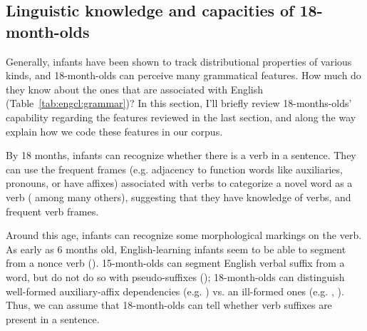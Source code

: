 \subsection{Linguistic knowledge and capacities of 18-month-olds}
\label{sec:engcl:bg:assumptions}

Generally, infants have been shown to track distributional properties of various kinds, and 18-month-olds can perceive many grammatical features. How much do they know about the ones that are associated with English \diis{} (Table~\ref{tab:engcl:grammar})? In this section, I'll briefly review 18-months-olds' capability regarding the features reviewed in the last section, and along the way explain how we code these features in our corpus. %

 By 18 months, infants can recognize whether there is a verb in a sentence. They can use the frequent frames (e.g. adjacency to function words like auxiliaries, pronouns, or have affixes) associated with verbs to categorize a novel word as a verb (\cite{echols2004verb, mintz2006verb,peterson2006aux,soderstrom2007sv, lidzoritaomaki2012, shi2014functional, helidz2017verb} among many others), suggesting that they have knowledge of verbs, and frequent verb frames. 

 Around this age, infants can recognize some morphological markings on the verb.  As early as 6 months old, English-learning infants seem to be able to segment  from a nonce verb (\cite{kimmegha2016morph}). 15-month-olds can segment English verbal suffix  from a word, but do not do so with pseudo-suffixes (\cite{mintz2013segmentation}); 18-month-olds can distinguish well-formed auxiliary-affix dependencies (e.g. ) vs. an ill-formed ones (e.g. , \cite{santelmann1998morph}). Thus, we can assume that 18-month-olds can tell whether verb suffixes are present in a sentence.

